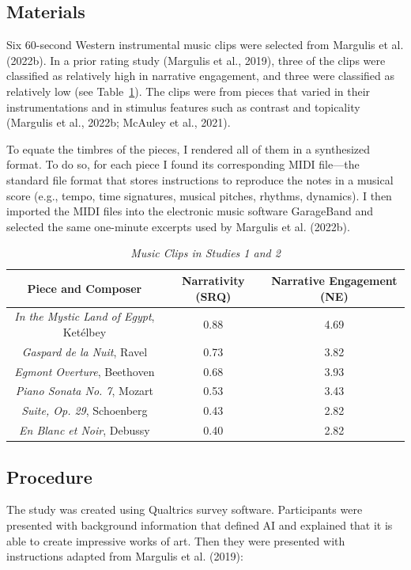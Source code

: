 \documentclass[12pt,twoside]{reedthesis}
\begin{document}
\subsection*{Materials}
Six 60-second Western instrumental music clips were selected from Margulis et al. (2022b). In a prior rating study (Margulis et al., 2019), three of the clips were classified as relatively high in narrative engagement, and three were classified as relatively low (see Table~\ref*{table-stimuli}). The clips were from pieces that varied in their instrumentations and in stimulus features such as contrast and topicality (Margulis et al., 2022b; McAuley et al., 2021).

To equate the timbres of the pieces, I rendered all of them in a synthesized format. To do so, for each piece I found its corresponding MIDI file—the standard file format that stores instructions to reproduce the notes in a musical score (e.g., tempo, time signatures, musical pitches, rhythms, dynamics). I then imported the MIDI files into the electronic music software GarageBand and selected the same one-minute excerpts used by Margulis et al. (2022b).


\begin{table}[h]
	\caption {\emph{Music Clips in Studies 1 and 2}} \label{table-stimuli}
	\bigskip
	\begin{tabular}{c c c}
	\toprule
	Piece and Composer & Narrativity (SRQ) & Narrative Engagement (NE) \\
	\hline
	\emph{In the Mystic Land of Egypt}, Ketélbey & 0.88 & 4.69 \\
	\hline
	\emph{Gaspard de la Nuit}, Ravel & 0.73 & 3.82 \\
	\hline
	\emph{Egmont Overture}, Beethoven & 0.68 & 3.93 \\ 
	\hline
	\emph{Piano Sonata No. 7}, Mozart & 0.53 & 3.43 \\
	\hline
	\emph{Suite, Op. 29}, Schoenberg & 0.43 & 2.82 \\
	\hline
	\emph{En Blanc et Noir}, Debussy & 0.40 & 2.82 \\
	\bottomrule
	\end{tabular}\par
	\end{table}
	

\subsection*{Procedure}

The study was created using Qualtrics survey software. Participants were presented with background information that defined AI and explained that it is able to create impressive works of art. Then they were presented with instructions adapted from Margulis et al. (2019):
\\ 
\end{document}

